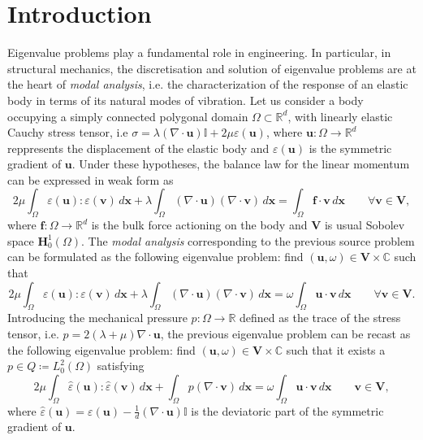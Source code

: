 \documentclass[USenglish]{article}
\theoremstyle{dgthm}
\theoremstyle{dgdef}
\let\vec\bm
\begin{document}
\section{Introduction}
Eigenvalue problems play a fundamental role in engineering. In particular, in structural mechanics, the discretisation and solution of eigenvalue problems are at the heart of \textit{modal analysis}, i.e. the characterization of the response of an elastic body in terms of its natural modes of vibration.
Let us consider a body occupying a simply connected polygonal domain $\Omega\subset \mathbb{R}^d$, with linearly elastic Cauchy stress tensor, i.e $\sigma = \lambda (\nabla\cdot \vec{u})\mathbb{I}+2\mu\varepsilon(\vec{u})$, where $\vec{u}:\Omega\to \mathbb{R}^d$ reppresents the displacement of the elastic body and $\varepsilon(\vec{u})$ is the symmetric gradient of $\vec{u}$.
Under these hypotheses, the balance law for the linear momentum can be expressed in weak form as 
\begin{equation}
  \label{eq:elasticityPrimalSource}
  2\mu \int_{\Omega} \varepsilon(\vec{u}):\varepsilon(\vec{v})\, d\vec{x} + \lambda \int_{\Omega} (\nabla \cdot \vec{u})(\nabla\cdot \vec{v})\, d\vec{x} = \int_{\Omega}\vec{f}\cdot \vec{v} \,d\vec{x} \qquad \forall \vec{v}\in \vec{V},
\end{equation}
where $\vec{f}:\Omega\to \mathbb{R}^d$ is the bulk force actioning on the body and $\vec{V}$ is usual Sobolev space $\vec{H}^1_0(\Omega)$. The \textit{modal analysis} corresponding to the previous source problem can be formulated as the following eigenvalue problem:
find $(\vec{u},\omega)\in \vec{V}\times \mathbb{C}$ such that
\begin{equation}
  \label{eq:elasticityPrimalEig}
  2\mu \int_{\Omega} \varepsilon(\vec{u}):\varepsilon(\vec{v})\, d\vec{x} + \lambda \int_{\Omega} (\nabla \cdot \vec{u})(\nabla\cdot \vec{v})\, d\vec{x} = \omega \int_{\Omega}\vec{u}\cdot \vec{v} \,d\vec{x} \qquad \forall \vec{v} \in \vec{V}.
\end{equation}
Introducing the mechanical pressure $p:\Omega\to \mathbb{R}$ defined as the trace of the stress tensor, i.e. $p = 2(\lambda+\mu) \nabla\cdot \vec{u}$, the previous eigenvalue problem can be recast as the following eigenvalue problem:
find $(\vec{u},\omega)\in \vec{V}\times \mathbb{C}$ such that it exists a $p\in Q\coloneqq L^2_0(\Omega)$ satisfying
\begin{equation}
  \label{eq:elasticityPressureEig}
    2\mu \int_\Omega \widehat\varepsilon(\vec{u}):\widehat \varepsilon(\vec{v})\, d\vec{x}+\int_\Omega p (\nabla \cdot \vec{v})\, d\vec{x} = \omega \int_\Omega \vec{u}\cdot \vec{v}\, d\vec{x} \qquad \vec{v}\in \vec{V},
\end{equation}
where $\widehat\varepsilon(\vec{u}) = \varepsilon(\vec{u})-\frac{1}{d}(\nabla\cdot \vec{u})\mathbb{I}$ is the deviatoric part of the symmetric gradient of $\vec{u}$.
\end{document}

